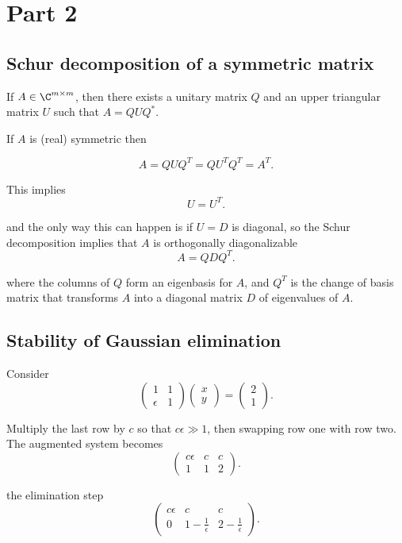 \section{Part 2}%
\label{sec:part_2}

\subsection{Schur decomposition of a symmetric matrix}%
\label{sub:schur_decomposition_of_a_symmetric_matrix}

If $A \in \C^{m\times m}$, then there exists a unitary matrix $Q$ and an upper
triangular matrix $U$ such that $A = QUQ^{*}$. 

If $A$ is (real) symmetric then

\[
   A = QUQ^{T} = QU^{T}Q^{T} = A^{T}
.\] 

This implies
\[
U = U^{T}
.\] 

and the only way this can happen is if $U = D$ is diagonal, so the Schur
decomposition implies that $A$ is orthogonally diagonalizable
\[
A = QDQ^{T}
.\] 

where the columns of $Q$ form an eigenbasis for $A$, and  $Q^{T}$ is the change
of basis matrix that transforms $A$ into a diagonal matrix $D$ of eigenvalues
of $A$.

\subsection{Stability of Gaussian elimination}%
\label{sub:stability_of_gaussian_elimination}

Consider
\[
\begin{pmatrix}
  1 & 1 \\ \epsilon & 1
\end{pmatrix} \begin{pmatrix}
  x \\ y
\end{pmatrix} = \begin{pmatrix}
  2 \\ 1
\end{pmatrix}
.\] 

Multiply the last row by $c$ so that $c \epsilon \gg 1$, then swapping row one with
row two. The augmented system becomes
\[
  \begin{pmatrix}
    c \epsilon & c & c \\
    1 & 1 & 2
  \end{pmatrix}
.\] 

the elimination step
\[
\begin{pmatrix}
  c \epsilon & c & c \\
  0 & 1-\frac{1}{\epsilon }  & 2-\frac{1}{\epsilon }
\end{pmatrix}
.\] 

